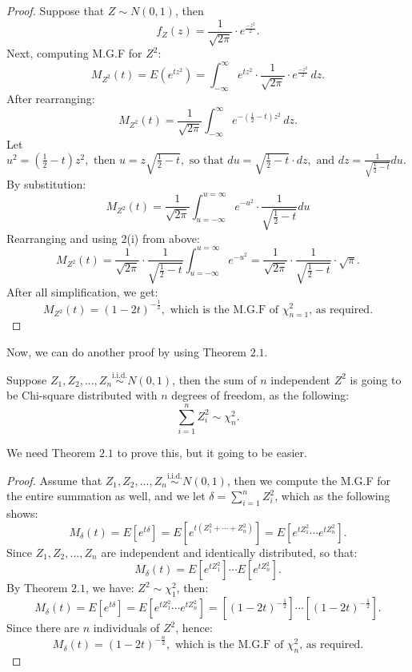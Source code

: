 \begin{proof}
Suppose that $Z \sim N(0, 1)$, then \[ f_{Z}(z) = \frac{1}{\sqrt{2\pi}} \cdot e^{\frac{-z^2}{2}}.\] 
\hspace*{2.7em} Next, computing M.G.F for $Z^2$: \[ M_{Z^2}(t) = E(e^{tz^2}) = \int_{-\infty}^{\infty} e^{tz^2} \cdot \frac{1}{\sqrt{2\pi}} \cdot e^{\frac{-z^2}{2}}\, dz.\]
\hspace*{2.7em} After rearranging: \[  M_{Z^2}(t) = \frac{1}{\sqrt{2\pi}} \int_{-\infty}^{\infty} e^{-(\frac{1}{2} - t)z^2}\, dz. \]
\hspace*{2.7em} Let $u^2 = (\frac{1}{2} - t)z^2, \text{ then } u = z\sqrt{\frac{1}{2}-t}, \text{ so that } du = \sqrt{\frac{1}{2}-t} \cdot dz, \text{ and } dz = \frac{1}{\sqrt{\frac{1}{2}-t}}du.$
\hspace*{2.7em} By substitution: \[ M_{Z^2}(t) = \frac{1}{\sqrt{2\pi}} \int_{u = -\infty}^{u = \infty} e^{-u^2} \cdot \frac{1}{\sqrt{\frac{1}{2}-t}}du\]
\hspace*{2.7em} Rearranging and using 2(i) from above: \[ M_{Z^2}(t) = \frac{1}{\sqrt{2\pi}} \cdot \frac{1}{\sqrt{\frac{1}{2}-t}} \int_{u = -\infty}^{u = \infty} e^{-u^2} = \frac{1}{\sqrt{2\pi}} \cdot \frac{1}{\sqrt{\frac{1}{2}-t}} \cdot \sqrt{\pi}.\]
\hspace*{2.7em} After all simplification, we get: \[ M_{Z^2}(t) = (1-2t)^{-\frac{1}{2}}, \text{ which is the M.G.F of $\chi_{n = 1}^{2}$, as required.}\]
\end{proof}

Now, we can do another proof by using Theorem $2.1$.

\begin{theorem}[$ \sum_{i = 1}^{n}Z_{i}^{2} \sim \chi_{n}^{2}$]
Suppose $Z_1, Z_2, ..., Z_n \overset{\text{i.i.d.}}{\sim} N(0,1)$, then the sum of $n$ independent $Z^2$ is going to be Chi-square distributed with $n$ degrees of freedom, as the following: \[ \sum_{i=1}^{n}Z_{i}^{2} \sim \chi_{n}^{2}.\]
\end{theorem}

We need Theorem $2.1$ to prove this, but it going to be easier. 

\begin{proof}
Assume that $Z_1, Z_2, ..., Z_n \overset{\text{i.i.d.}}{\sim} N(0,1)$, then we compute the M.G.F for the entire summation as well, and we let $\delta = \sum_{i = 1}^{n} Z_{i}^{2}$, which as the following shows: \[ M_{\delta}(t) = E[e^{t\delta}] = E[e^{t(Z_1^2 + \cdots + Z_n^2)}] = E[e^{tZ_1^2} \cdots e^{tZ_n^2}].\]
\hspace*{2.7em} Since $Z_1, Z_2, ..., Z_n$ are independent and identically distributed, so that: \[ M_{\delta}(t) = E[e^{tZ_1^2}] \cdots E[e^{tZ_n^2}].\]
\hspace*{2.7em} By Theorem $2.1$, we have: $Z^2 \sim \chi_{1}^{2}$, then: \[ M_{\delta}(t) = E[e^{t\delta}] = E[e^{tZ_1^2} \cdots e^{tZ_n^2}] = [(1-2t)^{-\frac{1}{2}}] \cdots [(1-2t)^{-\frac{1}{2}}].\]
\hspace*{2.7em} Since there are $n$ individuals of $Z^2$, hence: \[ M_{\delta}(t) = (1-2t)^{-\frac{n}{2}}, \text{ which is the M.G.F of $\chi_{n}^{2}$, as required}.\]
\end{proof}

